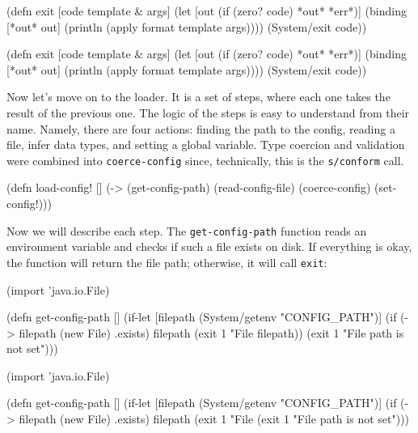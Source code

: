 
\ifnarrow

\begin{clojure}
(defn exit
  [code template & args]
  (let [out (if (zero? code)
              *out*
              *err*)]
    (binding [*out* out]
      (println (apply format
        template args))))
  (System/exit code))
\end{clojure}

\else

\begin{clojure}
(defn exit
  [code template & args]
  (let [out (if (zero? code) *out* *err*)]
    (binding [*out* out]
      (println (apply format template args))))
  (System/exit code))
\end{clojure}

\fi

Now let's move on to the loader. It is a set of steps, where each one takes the result of the previous one. The logic of the steps is easy to understand from their name. Namely, there are four actions: finding the path to the config, reading a file, infer data types, and setting a global variable. Type coercion and validation were combined into \verb|coerce-config| since, technically, this is the \verb|s/conform| call.


\begin{clojure}
(defn load-config! []
  (-> (get-config-path)
      (read-config-file)
      (coerce-config)
      (set-config!)))
\end{clojure}

Now we will describe each step. The \verb|get-config-path| function reads an environment variable and checks if such a file exists on disk. If everything is okay, the function will return the file path; otherwise, it will call \verb|exit|:


\ifnarrow

\begin{clojure}
(import 'java.io.File)

(defn get-config-path []
  (if-let [filepath (System/getenv
                      "CONFIG_PATH")]
    (if (-> filepath (new File) .exists)
      filepath
      (exit 1 "File %
        filepath))
    (exit 1 "File path is not set")))
\end{clojure}

\else

\begin{clojure}
(import 'java.io.File)

(defn get-config-path []
  (if-let [filepath (System/getenv "CONFIG_PATH")]
    (if (-> filepath (new File) .exists)
      filepath
      (exit 1 "File %
    (exit 1 "File path is not set")))
\end{clojure}

